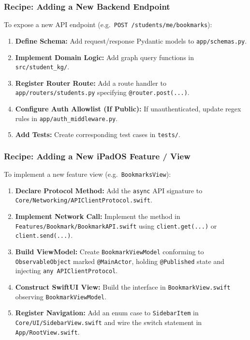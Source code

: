 \subsubsection*{Recipe: Adding a New Backend Endpoint}

To expose a new API endpoint (e.g.\ \texttt{POST /students/me/bookmarks}):

\begin{enumerate}
    \item \textbf{Define Schema:} Add request/response Pydantic models to \texttt{app/schemas.py}.
    \item \textbf{Implement Domain Logic:} Add graph query functions in
          \texttt{src/student\_kg/}.
    \item \textbf{Register Router Route:} Add a route handler to
          \texttt{app/routers/students.py} specifying \texttt{@router.post(...)}.
    \item \textbf{Configure Auth Allowlist (If Public):} If unauthenticated, update regex rules
          in \texttt{app/auth\_middleware.py}.
    \item \textbf{Add Tests:} Create corresponding test cases in \texttt{tests/}.
\end{enumerate}

\subsubsection*{Recipe: Adding a New iPadOS Feature / View}

To implement a new feature view (e.g.\ \texttt{BookmarksView}):

{\sloppy
\begin{enumerate}
    \item \textbf{Declare Protocol Method:} Add the \texttt{async} API signature to
          \texttt{Core/\allowbreak Networking/\allowbreak APIClientProtocol.swift}.
    \item \textbf{Implement Network Call:} Implement the method in
          \texttt{Features/\allowbreak Bookmark/\allowbreak BookmarkAPI.swift}
          using \texttt{client.get(...)} or \texttt{client.send(...)}.
    \item \textbf{Build ViewModel:} Create \texttt{BookmarkViewModel} conforming to
          \texttt{ObservableObject} marked \texttt{@MainActor}, holding \texttt{@Published} state
          and injecting \texttt{any APIClientProtocol}.
    \item \textbf{Construct SwiftUI View:} Build the interface in
          \texttt{BookmarkView.swift} observing \texttt{BookmarkViewModel}.
    \item \textbf{Register Navigation:} Add an enum case to \texttt{SidebarItem} in
          \texttt{Core/\allowbreak UI/\allowbreak SidebarView.swift} and wire the switch statement in
          \texttt{App/\allowbreak RootView.swift}.
\end{enumerate}
\par}

